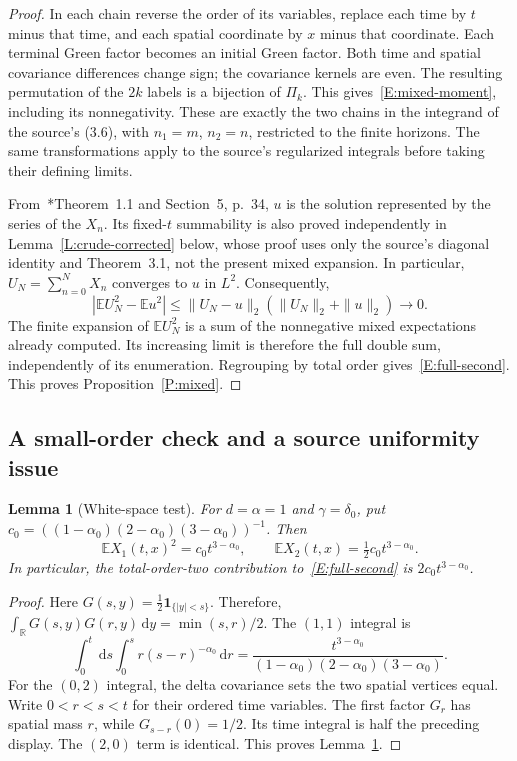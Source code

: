 \documentclass[12pt]{article}
\numberwithin{equation}{section}
\newtheorem{lemma}[theorem]{Lemma}
\theoremstyle{definition}
\newcommand{\R}{\mathbb{R}}
\newcommand{\E}{\mathbb{E}}
\newcommand{\ud}{\,\mathrm{d}}
\begin{document}
\begin{proof}
  In each chain reverse the order of its variables, replace each time by
  $t$ minus that time, and each spatial coordinate by $x$ minus that
  coordinate. Each terminal Green factor becomes an initial Green factor.
  Both time and spatial covariance differences change sign; the covariance
  kernels are even. The resulting permutation of the $2k$ labels is a
  bijection of $\Pi_k$. This gives~\eqref{E:mixed-moment}, including its
  nonnegativity. These are exactly the two chains in the integrand of
  the source's (3.6), with $n_1=m$, $n_2=n$, restricted to the finite
  horizons. The same transformations apply to the source's regularized
  integrals before taking their defining limits.

  From~\cite{chen:author2026:time-dependency}*{Theorem~1.1 and Section~5,
  p.~34}, $u$ is the solution represented by the series of the $X_n$.
  Its fixed-$t$ summability is also proved independently in
  Lemma~\ref{L:crude-corrected} below, whose proof uses only the source's
  diagonal identity and Theorem~3.1, not the present mixed expansion.
  In particular, $U_N=\sum_{n=0}^N X_n$ converges to $u$ in $L^2$.
  Consequently,
  \[
    |\E U_N^2-\E u^2|
    \le\|U_N-u\|_2(\|U_N\|_2+\|u\|_2)\longrightarrow0.
  \]
  The finite expansion of $\E U_N^2$ is a sum of the nonnegative mixed
  expectations already computed. Its increasing limit is therefore the
  full double sum, independently of its enumeration. Regrouping by total
  order gives~\eqref{E:full-second}. This proves Proposition~\ref{P:mixed}.
\end{proof}

\subsection{A small-order check and a source uniformity issue}

\begin{lemma}[White-space test]\label{L:white-test}
  For $d=\alpha=1$ and $\gamma=\delta_0$, put
  $c_0=((1-\alpha_0)(2-\alpha_0)(3-\alpha_0))^{-1}$. Then
  \begin{equation}\label{E:white-test}
    \E X_1(t,x)^2=c_0t^{3-\alpha_0},\qquad
    \E X_2(t,x)=\tfrac12c_0t^{3-\alpha_0}.
  \end{equation}
  In particular, the total-order-two contribution to~\eqref{E:full-second}
  is $2c_0t^{3-\alpha_0}$.
\end{lemma}

\begin{proof}
  Here $G(s,y)=\frac12\mathbf1_{\{|y|<s\}}$. Therefore,
  $\int_\R G(s,y)G(r,y)\ud y=\min(s,r)/2$. The $(1,1)$ integral is
  \[
    \int_0^t\ud s\int_0^s r(s-r)^{-\alpha_0}\ud r
    =\frac{t^{3-\alpha_0}}
    {(1-\alpha_0)(2-\alpha_0)(3-\alpha_0)}.
  \]
  For the $(0,2)$ integral, the delta covariance sets the two spatial
  vertices equal. Write $0<r<s<t$ for their ordered time variables.
  The first factor $G_r$ has spatial mass $r$, while
  $G_{s-r}(0)=1/2$. Its time integral is half the
  preceding display. The $(2,0)$ term is identical. This proves
  Lemma~\ref{L:white-test}.
\end{proof}
\end{document}
